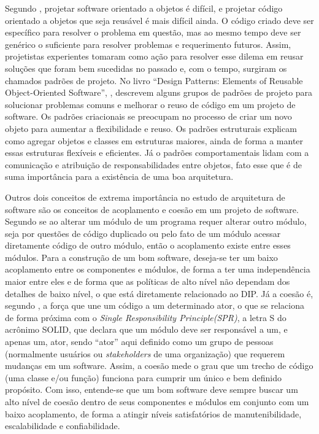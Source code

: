 \documentclass[12pt, %
openright, 
oneside, %
a4paper,    %
brazil]{facom-ufu-abntex2}
\begin{document}
Segundo , projetar software orientado a objetos é difícil, e projetar código orientado a objetos que seja reusável é mais difícil ainda. O código criado deve ser específico para resolver o problema em questão, mas ao mesmo tempo deve ser genérico o suficiente para resolver problemas e requerimento futuros. Assim, projetistas experientes tomaram como ação para resolver esse dilema em reusar soluções que foram bem sucedidas no passado e, com o tempo, surgiram os chamados padrões de projeto. No livro ``Design Patterns: Elements of Reusable Object-Oriented Software'', , descrevem alguns grupos de padrões de projeto para solucionar problemas comuns e melhorar o reuso de código em um projeto de software. Os padrões criacionais se preocupam no processo de criar um novo objeto para aumentar a flexibilidade e reuso. Os padrões estruturais explicam como agregar objetos e classes em estruturas maiores, ainda de forma a manter essas estruturas flexíveis e eficientes. Já o padrões comportamentais lidam com a comunicação e atribuição de responsabilidades entre objetos, fato esse que é de suma importância para a existência de uma boa arquitetura.

Outros dois conceitos de extrema importância no estudo de arquitetura de software são os conceitos de acoplamento e coesão em um projeto de software. Segundo  se ao alterar um módulo de um programa requer alterar outro módulo, seja por questões de código duplicado ou pelo fato de um módulo acessar diretamente código de outro módulo, então o acoplamento existe entre esses módulos. Para a construção de um bom software, deseja-se ter um baixo acoplamento entre os componentes e módulos, de forma a ter uma independência maior entre eles e de forma que as políticas de alto nível não dependam dos detalhes de baixo nível, o que está diretamente relacionado ao DIP. Já a coesão é, segundo , a força que une um código a um determinado ator, o que se relaciona de forma próxima com o \textit{Single Responsibility Principle(SPR)}, a letra S do acrônimo SOLID, que declara que um módulo deve ser responsável a um, e apenas um, ator, sendo ``ator'' aqui definido como um grupo de pessoas (normalmente usuários ou \textit{stakeholders} de uma organização) que requerem mudanças em um software. Assim, a coesão mede o grau que um trecho de código (uma classe e/ou função) funciona para cumprir um único e bem definido propósito. Com isso, entende-se que um bom software deve sempre buscar um alto nível de coesão dentro de seus componentes e módulos em conjunto com um baixo acoplamento, de forma a atingir níveis satisfatórios de manutenibilidade, escalabilidade e confiabilidade.
\end{document}
